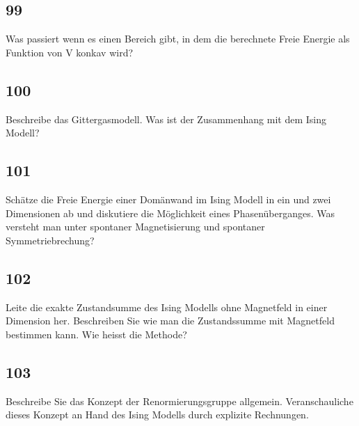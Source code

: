 \documentclass[12pt,a4paper]{report}
\newenvironment{myfrag}{\begin{it}}{\end{it}\vspace{3mm}\par}
\numberwithin{equation}{section}
\begin{document}
\subsection{99}
\begin{myfrag}
Was passiert wenn es einen Bereich gibt, in dem die berechnete Freie Energie
als Funktion von V konkav wird?
\end{myfrag} 
\subsection{100}
\begin{myfrag}
Beschreibe das Gittergasmodell. Was ist der Zusammenhang mit dem Ising
Modell?
\end{myfrag} 
\subsection{101}
\begin{myfrag}
Schätze die Freie Energie einer Domänwand im Ising Modell in ein und zwei
Dimensionen ab und diskutiere die Möglichkeit eines Phasenüberganges.
Was versteht man unter spontaner Magnetisierung und spontaner
Symmetriebrechung?
\end{myfrag} 
\subsection{102}
\begin{myfrag}
Leite die exakte Zustandsumme des Ising Modells ohne Magnetfeld in einer
Dimension her.
Beschreiben Sie wie man die Zustandssumme mit
Magnetfeld bestimmen kann. Wie heisst die Methode?
\end{myfrag} 
\subsection{103}
\begin{myfrag}
Beschreibe Sie das Konzept der Renormierungsgruppe allgemein.
Veranschauliche dieses Konzept an Hand des Ising Modells durch explizite
Rechnungen.
\end{myfrag} 
\end{document}
